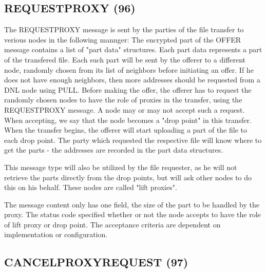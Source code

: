 \subsection{REQUESTPROXY (96)}

The REQUESTPROXY message is sent by the parties of the file transfer to verious
nodes in the following mannger: The encrypted part of the OFFER message contains
a list of "part data" structures. Each part data represents a part of the
transfered file. Each such part will be sent by the offerer to a different node,
randomly chosen from its list of neighbors before initiating an offer. If he
does not have enough neighbors, then more addresses should be requested from a
DNL node using PULL. Before making the offer, the offerer has to request the
randomly chosen nodes to have the role of proxies in the transfer, using the
REQUESTPROXY message. A node may or may not accept such a request. When
accepting, we say that the node becomes a "drop point" in this transfer. When
the transfer begins, the offerer will start uploading a part of the file to each
drop point. The party which requested the respective file will know where to get
the parts - the addresses are recorded in the part data structures.

This message type will also be utilized by the file requester, as he will not
retrieve the parts directly from the drop points, but will ask other nodes to
do this on his behalf. These nodes are called "lift proxies".

The message content only has one field, the size of the part to be handled by
the proxy. The status code specified whether or not the node accepts to have the
role of lift proxy or drop point. The acceptance criteria are dependent on
implementation or configuration.

\begin{figure}[H]
    \centering
\end{figure}

\subsection{CANCELPROXYREQUEST (97)}

